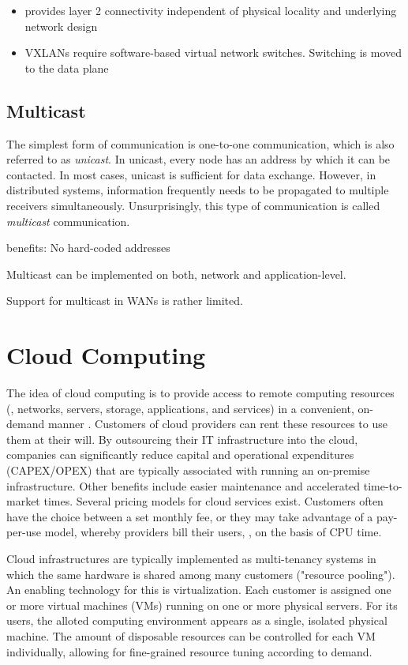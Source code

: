 \begin{itemize}
	\item provides layer 2 connectivity independent of physical locality and underlying network design
	\item VXLANs require software-based virtual network switches. Switching is moved to the data plane
\end{itemize}

\subsection{Multicast}
The simplest form of communication is one-to-one communication, which is also referred to as \emph{unicast}. In unicast, every node has an address by which it can be contacted. In most cases, unicast is sufficient for data exchange. However, in distributed systems, information frequently needs to be propagated to multiple receivers simultaneously. Unsurprisingly, this type of communication is called \emph{multicast} communication. 

benefits: No hard-coded addresses

Multicast can be implemented on both, network and application-level.

Support for multicast in WANs is rather limited.

%
%
%
%
%
%
%
%
%
%

\section{Cloud Computing}

The idea of cloud computing is to provide access to remote computing resources  (\eg , networks, servers, storage, applications, and services) in a convenient, on-demand manner \cite{mell2011nist}. Customers of cloud providers can rent these resources to use them at their will. By outsourcing their IT infrastructure into the cloud, companies can significantly reduce capital and operational expenditures (CAPEX/OPEX) that are typically associated with running an on-premise infrastructure. Other benefits include easier maintenance and accelerated time-to-market times. Several pricing models for cloud services exist. Customers often have the choice between a set monthly fee, or they may take advantage of a pay-per-use model, whereby providers bill their users, \eg , on the basis of CPU time.

Cloud infrastructures are typically implemented as multi-tenancy systems in which the same hardware is shared among many customers ("resource pooling"). An enabling technology for this is virtualization. Each customer is assigned one or more virtual machines (VMs) running on one or more physical servers. For its users, the alloted computing environment appears as a single, isolated physical machine. The amount of disposable resources can be controlled for each VM individually, allowing for fine-grained resource tuning according to demand.

